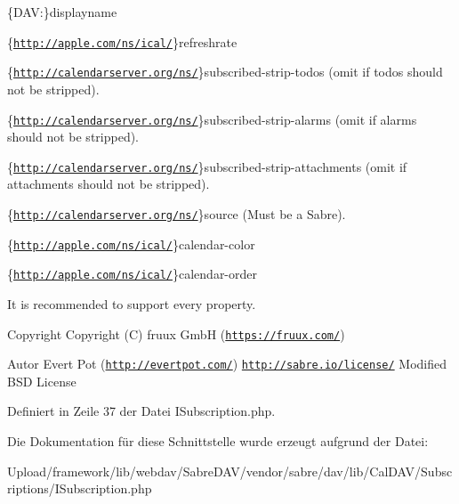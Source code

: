 \begin{DoxyEnumerate}
\item \{D\+AV\+:\}displayname
\item \{\href{http://apple.com/ns/ical/}{\tt http\+://apple.\+com/ns/ical/}\}refreshrate
\item \{\href{http://calendarserver.org/ns/}{\tt http\+://calendarserver.\+org/ns/}\}subscribed-\/strip-\/todos (omit if todos should not be stripped).
\item \{\href{http://calendarserver.org/ns/}{\tt http\+://calendarserver.\+org/ns/}\}subscribed-\/strip-\/alarms (omit if alarms should not be stripped).
\item \{\href{http://calendarserver.org/ns/}{\tt http\+://calendarserver.\+org/ns/}\}subscribed-\/strip-\/attachments (omit if attachments should not be stripped).
\item \{\href{http://calendarserver.org/ns/}{\tt http\+://calendarserver.\+org/ns/}\}source (Must be a Sabre).
\item \{\href{http://apple.com/ns/ical/}{\tt http\+://apple.\+com/ns/ical/}\}calendar-\/color
\item \{\href{http://apple.com/ns/ical/}{\tt http\+://apple.\+com/ns/ical/}\}calendar-\/order
\end{DoxyEnumerate}

It is recommended to support every property.

\begin{DoxyCopyright}{Copyright}
Copyright (C) fruux GmbH (\href{https://fruux.com/}{\tt https\+://fruux.\+com/}) 
\end{DoxyCopyright}
\begin{DoxyAuthor}{Autor}
Evert Pot (\href{http://evertpot.com/}{\tt http\+://evertpot.\+com/})  \href{http://sabre.io/license/}{\tt http\+://sabre.\+io/license/} Modified B\+SD License 
\end{DoxyAuthor}


Definiert in Zeile 37 der Datei I\+Subscription.\+php.



Die Dokumentation für diese Schnittstelle wurde erzeugt aufgrund der Datei\+:\begin{DoxyCompactItemize}
\item 
Upload/framework/lib/webdav/\+Sabre\+D\+A\+V/vendor/sabre/dav/lib/\+Cal\+D\+A\+V/\+Subscriptions/I\+Subscription.\+php\end{DoxyCompactItemize}
